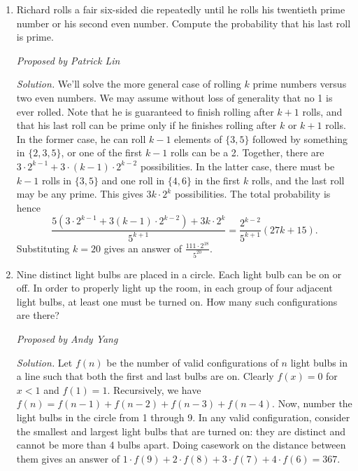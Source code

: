 \documentclass[10pt]{article}
\newcommand{\proposed}[1]
{
\vspace{5pt}
\noindent\textit{Proposed by #1}
}
\newcommand{\solution}
{
\vspace{5pt}
\noindent\textit{Solution.}\qquad
}
\begin{document}
\begin{enumerate}
\proposed{Patrick Lin}

\solution Call the four aces and the two jokers \textit{special} cards. Conditioned on the first ace being the $i$-th special card to appear, the number of piles is equal to the one plus the number of cards between the $i$-th and $(i-1)$-th special cards; by symmetry, this is one plus the expected number of cards until we draw the first special card, which is $1 + \frac{48}{7} = \boxed{\tfrac{55}{7}}$.



\item Richard rolls a fair six-sided die repeatedly until he rolls his twentieth prime number or his second even number. Compute the probability that his last roll is prime.

\proposed{Patrick Lin}

\solution We'll solve the more general case of rolling $k$ prime numbers versus two even numbers. We may assume without loss of generality that no 1 is ever rolled. Note that he is guaranteed to finish rolling after $k+1$ rolls, and that his last roll can be prime only if he finishes rolling after $k$ or $k+1$ rolls. In the former case, he can roll $k-1$ elements of $\{3,5\}$ followed by something in $\{2,3,5\}$, or one of the first $k-1$ rolls can be a 2. Together, there are $3\cdot 2^{k-1} + 3\cdot(k-1)\cdot 2^{k-2}$ possibilities. In the latter case, there must be $k-1$ rolls in $\{3,5\}$ and one roll in $\{4,6\}$ in the first $k$ rolls, and the last roll may be any prime. This gives $3k\cdot 2^k$ possibilities. The total probability is hence
\[\frac{5(3\cdot2^{k-1} + 3(k-1)\cdot2^{k-2}) + 3k\cdot2^k}{5^{k+1}} = \frac{2^{k-2}}{5^{k+1}}(27k+15).\]
Substituting $k = 20$ gives an answer of $\boxed{\tfrac{111\cdot2^{18}}{5^{20}}}$.



\item Nine distinct light bulbs are placed in a circle. Each light bulb can be on or off. In order to properly light up the room, in each group of four adjacent light bulbs, at least one must be turned on. How many such configurations are there?

\proposed{Andy Yang}

\solution Let $f(n)$ be the number of valid configurations of $n$ light bulbs in a line such that both the first and last bulbs are on. Clearly $f(x) = 0$ for $x < 1$ and $f(1) = 1$. Recursively, we have $f(n) = f(n-1) + f(n-2) + f(n-3) + f(n-4)$. Now, number the light bulbs in the circle from 1 through 9. In any valid configuration, consider the smallest and largest light bulbs that are turned on: they are distinct and cannot be more than 4 bulbs apart. Doing casework on the distance between them gives an answer of $1\cdot f(9) + 2\cdot f(8) + 3\cdot f(7) + 4\cdot f(6) = \boxed{367}$.




\end{enumerate}
\end{document}
